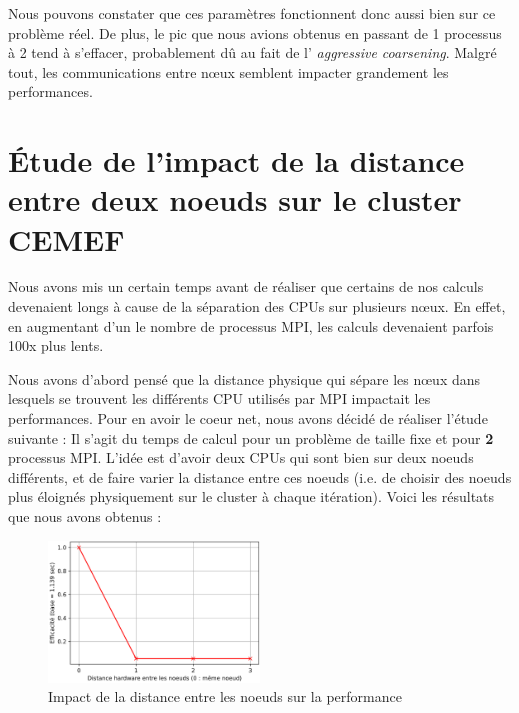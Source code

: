 \documentclass[10pt,twocolumn,letterpaper]{article}
\begin{document}
Nous pouvons constater que ces paramètres fonctionnent donc aussi bien sur ce
problème réel.
De plus, le pic que nous avions obtenus en passant de 1 processus
à 2 tend à s'effacer, probablement dû au fait de l'
\textit{aggressive coarsening}. Malgré tout, les communications entre nœux
semblent impacter grandement les performances.

\section{Étude de l'impact de la distance entre deux noeuds sur le cluster
CEMEF}

Nous avons mis un certain temps avant de réaliser que certains de nos calculs
devenaient longs à cause de la séparation des CPUs sur plusieurs nœux. En effet,
en augmentant d'un le nombre de processus MPI, les calculs devenaient parfois
100x plus lents.

Nous avons d'abord pensé que la distance physique qui sépare les nœux dans
lesquels se trouvent les différents CPU utilisés par MPI impactait les
performances. Pour en avoir le coeur net, nous avons décidé de réaliser l'étude
suivante :
Il s'agit du temps de calcul pour un problème de taille fixe et pour \textbf{2}
processus MPI. L'idée est d'avoir deux CPUs qui sont bien sur deux noeuds
différents, et de faire varier la distance entre ces noeuds
(i.e. de choisir des noeuds plus éloignés physiquement sur le cluster à chaque
itération). Voici les résultats que nous avons obtenus :

\begin{figure}[H]
    \centering
    \caption{Impact de la distance entre les noeuds sur la performance}
    \includegraphics[width=0.50\textwidth]{fig/dist_profiling.png}
  \end{figure}
\end{document}
